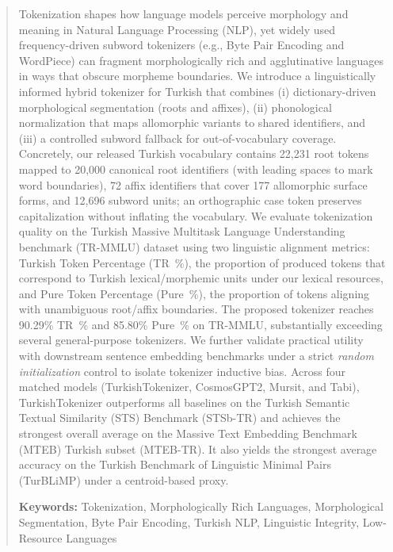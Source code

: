 \begin{abstract}

Tokenization shapes how language models perceive morphology and meaning in Natural Language Processing (NLP), yet widely used frequency-driven subword tokenizers (e.g., Byte Pair Encoding and WordPiece) can fragment morphologically rich and agglutinative languages in ways that obscure morpheme boundaries. We introduce a linguistically informed hybrid tokenizer for Turkish that combines (i) dictionary-driven morphological segmentation (roots and affixes), (ii) phonological normalization that maps allomorphic variants to shared identifiers, and (iii) a controlled subword fallback for out-of-vocabulary coverage. Concretely, our released Turkish vocabulary contains 22,231 root tokens mapped to 20,000 canonical root identifiers (with leading spaces to mark word boundaries), 72 affix identifiers that cover 177 allomorphic surface forms, and 12,696 subword units; an orthographic case token preserves capitalization without inflating the vocabulary. We evaluate tokenization quality on the Turkish Massive Multitask Language Understanding benchmark (TR-MMLU) dataset using two linguistic alignment metrics: Turkish Token Percentage (TR~\%), the proportion of produced tokens that correspond to Turkish lexical/morphemic units under our lexical resources, and Pure Token Percentage (Pure~\%), the proportion of tokens aligning with unambiguous root/affix boundaries. The proposed tokenizer reaches 90.29\% TR~\% and 85.80\% Pure~\% on TR-MMLU, substantially exceeding several general-purpose tokenizers. We further validate practical utility with downstream sentence embedding benchmarks under a strict \emph{random initialization} control to isolate tokenizer inductive bias. Across four matched models (TurkishTokenizer, CosmosGPT2, Mursit, and Tabi), TurkishTokenizer outperforms all baselines on the Turkish Semantic Textual Similarity (STS) Benchmark (STSb-TR) and achieves the strongest overall average on the Massive Text Embedding Benchmark (MTEB) Turkish subset (MTEB-TR). It also yields the strongest average accuracy on the Turkish Benchmark of Linguistic Minimal Pairs (TurBLiMP) under a centroid-based proxy.

\textbf{Keywords:} Tokenization, Morphologically Rich Languages, Morphological Segmentation, Byte Pair Encoding, Turkish NLP, Linguistic Integrity, Low-Resource Languages
\end{abstract}
